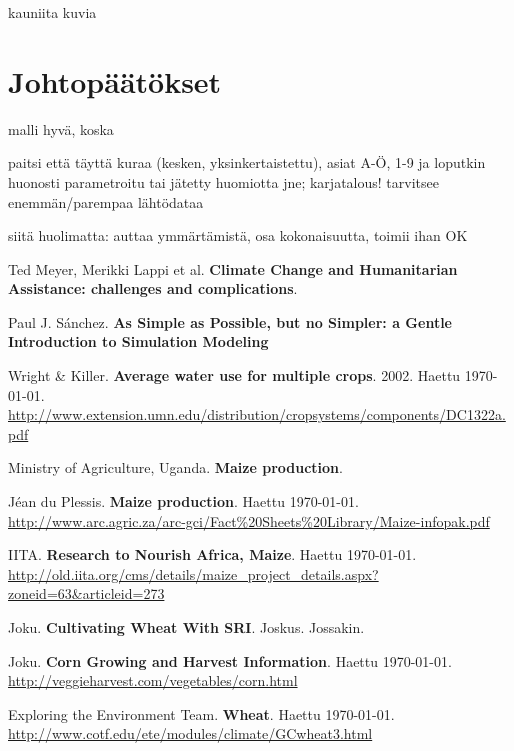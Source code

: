 \documentclass[12pt]{scrreprt}
\renewcommand\emph{\textbf}
\begin{document}
  kauniita kuvia

  \chapter{Johtopäätökset}

  malli hyvä, koska
  
  paitsi että täyttä kuraa (kesken, yksinkertaistettu), asiat A-Ö, 1-9 ja
  loputkin huonosti parametroitu tai jätetty huomiotta jne; karjatalous!
  tarvitsee enemmän/parempaa lähtödataa
  
  siitä huolimatta: auttaa ymmärtämistä, osa kokonaisuutta, toimii ihan OK

  \begin{thebibliography}{9}
  
  	Ted Meyer, Merikki Lappi et al.
  	\emph{Climate Change and Humanitarian Assistance: challenges and complications}.
  	
  	Paul J. Sánchez.
  	\emph{As Simple as Possible, but no Simpler: a Gentle Introduction to Simulation Modeling}

    Wright \& Killer.
    \emph{Average water use for multiple crops}.
    2002.
    Haettu \today. \\
    \url{http://www.extension.umn.edu/distribution/cropsystems/components/DC1322a.pdf}

    Ministry of Agriculture, Uganda.
    \emph{Maize production}.

    Jéan du Plessis.
    \emph{Maize production}.
    Haettu \today. \\
    \url{http://www.arc.agric.za/arc-gci/Fact%20Sheets%20Library/Maize-infopak.pdf}

    IITA.
    \emph{Research to Nourish Africa, Maize}.
    Haettu \today. \\
    \url{http://old.iita.org/cms/details/maize_project_details.aspx?zoneid=63&articleid=273}

    Joku.
    \emph{Cultivating Wheat With SRI}.
    Joskus.
    Jossakin.

    Joku.
    \emph{Corn Growing and Harvest Information}.
    Haettu \today. \\
    \url{http://veggieharvest.com/vegetables/corn.html}

    Exploring the Environment Team.
    \emph{Wheat}.
    Haettu \today. \\
    \url{http://www.cotf.edu/ete/modules/climate/GCwheat3.html}


\end{thebibliography}
\end{document}
